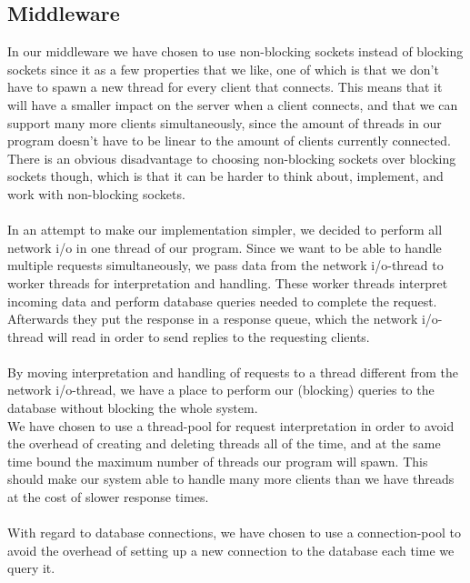 \documentclass{article}
\begin{document}
        \subsection{Middleware}
            \label{sec:description_middleware}
            In our middleware we have chosen to use non-blocking sockets instead of blocking sockets since it as a few properties that we like, one of which is that we don't have to spawn a new thread for every client that connects. This means that it will have a smaller impact on the server when a client connects, and that we can support many more clients simultaneously, since the amount of threads in our program doesn't have to be linear to the amount of clients currently connected. There is an obvious disadvantage to choosing non-blocking sockets over blocking sockets though, which is that it can be harder to think about, implement, and work with non-blocking sockets.\\
            \\
            In an attempt to make our implementation simpler, we decided to perform all network i/o in one thread of our program. Since we want to be able to handle multiple requests simultaneously, we pass data from the network i/o-thread to worker threads for interpretation and handling. These worker threads interpret incoming data and perform database queries needed to complete the request. Afterwards they put the response in a response queue, which the network i/o-thread will read in order to send replies to the requesting clients.\\
            \\
            By moving interpretation and handling of requests to a thread different from the network i/o-thread, we have a place to perform our (blocking) queries to the database without blocking the whole system.\\
            We have chosen to use a thread-pool for request interpretation in order to avoid the overhead of creating and deleting threads all of the time, and at the same time bound the maximum number of threads our program will spawn. This should make our system able to handle many more clients than we have threads at the cost of slower response times.\\
            \\
            With regard to database connections, we have chosen to use a connection-pool to avoid the overhead of setting up a new connection to the database each time we query it.\\
            \\
\end{document}
